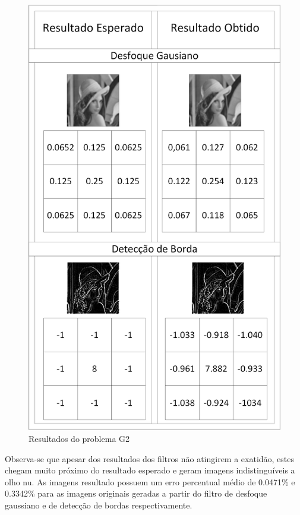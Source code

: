 \begin{figure}[h]
	\centering
	\includegraphics[scale=0.9]{Figuras/Problems-G2Results.png}
	\caption{Resultados do problema G2}
	\label{fig:Problems-G2Results}
\end{figure}

Observa-se que apesar dos resultados dos filtros não atingirem a exatidão, estes chegam muito próximo do resultado esperado e geram imagens indistinguíveis a olho nu. As imagens resultado possuem um erro percentual médio de 0.0471\% e 0.3342\% para as imagens originais geradas a partir do filtro de desfoque gaussiano e de detecção de bordas respectivamente.  

